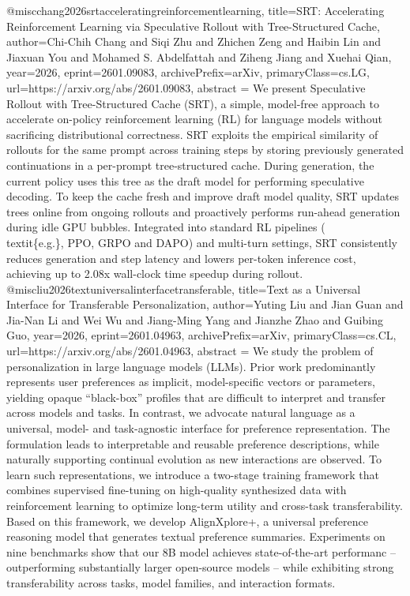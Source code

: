 {}@misc{chang2026srtacceleratingreinforcementlearning,
      title={SRT: Accelerating Reinforcement Learning via Speculative Rollout with Tree-Structured Cache}, 
      author={Chi-Chih Chang and Siqi Zhu and Zhichen Zeng and Haibin Lin and Jiaxuan You and Mohamed S. Abdelfattah and Ziheng Jiang and Xuehai Qian},
      year={2026},
      eprint={2601.09083},
      archivePrefix={arXiv},
      primaryClass={cs.LG},
      url={https://arxiv.org/abs/2601.09083},
      abstract = {We present Speculative Rollout with Tree-Structured Cache (SRT), a simple, model-free approach to accelerate on-policy reinforcement learning (RL) for language models without sacrificing distributional correctness. SRT exploits the empirical similarity of rollouts for the same prompt across training steps by storing previously generated continuations in a per-prompt tree-structured cache. During generation, the current policy uses this tree as the draft model for performing speculative decoding. To keep the cache fresh and improve draft model quality, SRT updates trees online from ongoing rollouts and proactively performs run-ahead generation during idle GPU bubbles. Integrated into standard RL pipelines (\\textit\{e.g.\}, PPO, GRPO and DAPO) and multi-turn settings, SRT consistently reduces generation and step latency and lowers per-token inference cost, achieving up to 2.08x wall-clock time speedup during rollout.}
}@misc{liu2026textuniversalinterfacetransferable,
      title={Text as a Universal Interface for Transferable Personalization}, 
      author={Yuting Liu and Jian Guan and Jia-Nan Li and Wei Wu and Jiang-Ming Yang and Jianzhe Zhao and Guibing Guo},
      year={2026},
      eprint={2601.04963},
      archivePrefix={arXiv},
      primaryClass={cs.CL},
      url={https://arxiv.org/abs/2601.04963},
      abstract = {We study the problem of personalization in large language models (LLMs). Prior work predominantly represents user preferences as implicit, model-specific vectors or parameters, yielding opaque ``black-box'' profiles that are difficult to interpret and transfer across models and tasks. In contrast, we advocate natural language as a universal, model- and task-agnostic interface for preference representation. The formulation leads to interpretable and reusable preference descriptions, while naturally supporting continual evolution as new interactions are observed. To learn such representations, we introduce a two-stage training framework that combines supervised fine-tuning on high-quality synthesized data with reinforcement learning to optimize long-term utility and cross-task transferability. Based on this framework, we develop AlignXplore+, a universal preference reasoning model that generates textual preference summaries. Experiments on nine benchmarks show that our 8B model achieves state-of-the-art performanc -- outperforming substantially larger open-source models -- while exhibiting strong transferability across tasks, model families, and interaction formats.}
}
